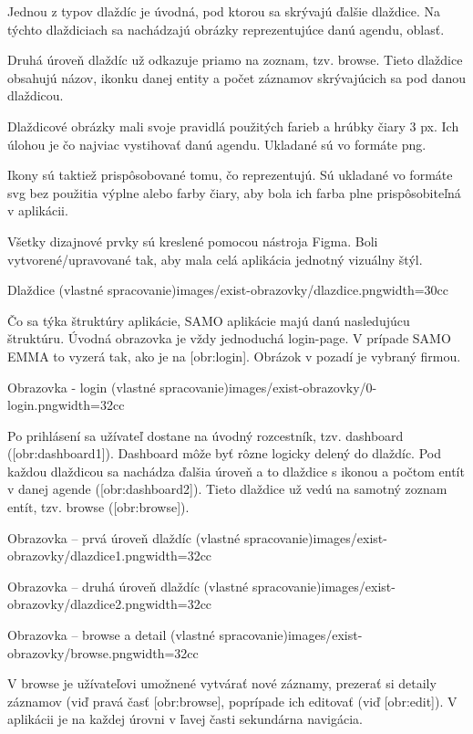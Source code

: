 Jednou z typov dlaždíc je úvodná, pod ktorou sa skrývajú ďalšie dlaždice. Na týchto dlaždiciach sa nachádzajú obrázky reprezentujúce danú agendu, oblasť. 

Druhá úroveň dlaždíc už odkazuje priamo na zoznam, tzv. browse. Tieto dlaždice obsahujú názov, ikonku danej entity a počet záznamov skrývajúcich sa pod danou dlaždicou. 

Dlaždicové obrázky mali svoje pravidlá použitých farieb a hrúbky čiary 3 px. Ich úlohou je čo najviac vystihovať danú agendu. Ukladané sú vo formáte png. 

Ikony sú taktiež prispôsobované tomu, čo reprezentujú. Sú ukladané vo formáte svg bez použitia výplne alebo farby čiary, aby bola ich farba plne prispôsobiteľná v aplikácii.

Všetky dizajnové prvky sú kreslené pomocou nástroja Figma. Boli vytvorené/upravované tak, aby mala celá aplikácia jednotný vizuálny štýl. 

{Dlaždice (vlastné spracovanie)}{images/exist-obrazovky/dlazdice.png}{width=30cc} 

Čo sa týka štruktúry aplikácie, SAMO aplikácie majú danú nasledujúcu štruktúru.  Úvodná obrazovka je vždy jednoduchá login-page. V prípade SAMO EMMA to vyzerá tak, ako je na [obr:login]. Obrázok v pozadí je vybraný firmou.

{Obrazovka - login (vlastné spracovanie)}{images/exist-obrazovky/0-login.png}{width=32cc} 

Po prihlásení sa užívateľ dostane na úvodný rozcestník, tzv. dashboard ([obr:dashboard1]). Dashboard môže byť rôzne logicky delený do dlaždíc. Pod každou dlaždicou sa nachádza ďalšia úroveň a to dlaždice s ikonou a počtom entít v danej agende ([obr:dashboard2]). Tieto dlaždice už vedú na samotný zoznam entít, tzv. browse ([obr:browse]).

{Obrazovka -- prvá úroveň dlaždíc (vlastné spracovanie)}{images/exist-obrazovky/dlazdice1.png}{width=32cc} 

{Obrazovka -- druhá úroveň dlaždíc (vlastné spracovanie)}{images/exist-obrazovky/dlazdice2.png}{width=32cc} 

{Obrazovka -- browse a detail (vlastné spracovanie)}{images/exist-obrazovky/browse.png}{width=32cc} 

V browse je užívateľovi umožnené vytvárať nové záznamy, prezerať si detaily záznamov (viď pravá časť [obr:browse], poprípade ich editovať (viď [obr:edit]). V aplikácii je na každej úrovni v ľavej časti sekundárna navigácia.

